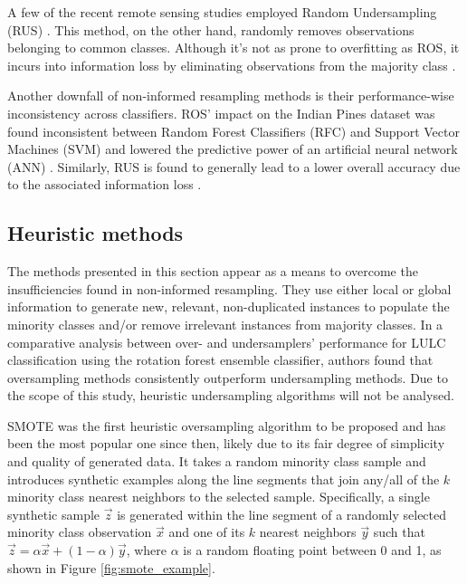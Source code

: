 \documentclass[parskip=full]{scrartcl}
\begin{document}
A few of the recent remote sensing studies employed Random Undersampling (RUS)
\cite{Ferreira2019}. This method, on the other hand, randomly removes
observations belonging to common classes. Although it's not as prone to
overfitting as ROS, it incurs into information loss by eliminating observations
from the majority class \cite{Feng2019}.

Another downfall of non-informed resampling methods is their performance-wise
inconsistency across classifiers. ROS' impact on the Indian Pines dataset was
found inconsistent between Random Forest Classifiers (RFC) and Support Vector
Machines (SVM) and lowered the predictive power of an artificial neural network
(ANN) \cite{Maxwell2018}. Similarly, RUS is found to generally lead to a
lower overall accuracy due to the associated information loss
\cite{Maxwell2018}.

\subsection{Heuristic methods}

The methods presented in this section appear as a means to overcome the
insufficiencies found in non-informed resampling. They use either local or
global information to generate new, relevant, non-duplicated instances to
populate the minority classes and/or remove irrelevant instances from majority
classes. In a comparative analysis between over- and undersamplers' performance
for LULC classification \cite{Feng2018} using the rotation forest
ensemble classifier, authors found that oversampling methods consistently
outperform undersampling methods. Due to the scope of this study, heuristic
undersampling algorithms will not be analysed.


SMOTE \cite{Chawla2002} was the first heuristic oversampling algorithm to
be proposed and has been the most popular one since then, likely due to its
fair degree of simplicity and quality of generated data. It takes a random
minority class sample and introduces synthetic examples along the line segments
that join any/all of the $k$ minority class nearest
neighbors to the selected sample. Specifically, a single synthetic sample
$\overrightarrow{z}$ is generated within the line segment of a randomly
selected minority class observation $\overrightarrow{x}$ and one of its
$k$ nearest neighbors $\overrightarrow{y}$ such that
$\overrightarrow{z} =
	\alpha\overrightarrow{x}+(1-\alpha)\overrightarrow{y}$, where $\alpha$ is a random floating point
between 0 and 1, as shown in Figure \ref{fig:smote_example}.
\end{document}
